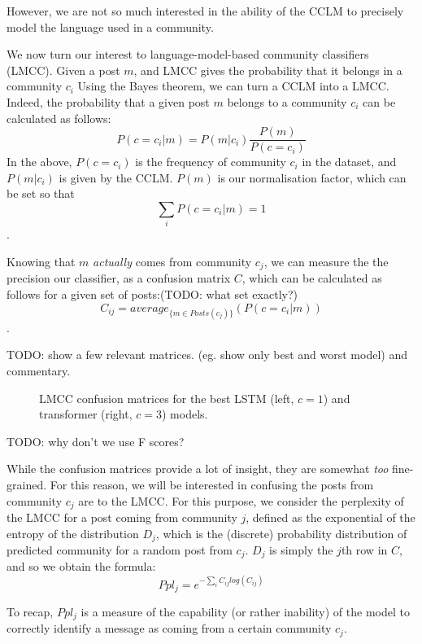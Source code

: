 \documentclass[11pt,a4paper]{article}
\begin{document}
However, we are not so much interested in the ability of the CCLM to
precisely model the language used in a community.

We now turn our interest to language-model-based community classifiers
(LMCC). Given a post $m$, and LMCC gives the probability that it
belongs in a community $c_i$ Using the Bayes theorem, we can turn a
CCLM into a LMCC. Indeed, the probability that a given post $m$
belongs to a community $c_i$ can be calculated as follows:
\[P(c=c_i | m) = P(m | c_i)\frac {P(m)} {P(c=c_i)}\]
In the above,
$P(c=c_i)$ is the frequency of community $c_i$ in the dataset, and
$P(m | c_i)$ is given by the CCLM. $P(m)$ is our normalisation factor, which can be set so that
\[\sum_i P(c=c_i | m) = 1\].

Knowing that $m$ \emph{actually} comes from community $c_j$, we can
measure the the precision our classifier, as a confusion matrix $C$,
which can be calculated as follows for a given set of posts:(TODO: what set exactly?)
\[C_{ij} = average_{\{m ∈ Posts(c_j)\}}(P(c=c_i | m))\].

TODO: show a few relevant matrices. (eg. show only best and worst model) and commentary.


\begin{figure*}
\caption{LMCC confusion matrices for the best LSTM (left, $c=1$) and transformer (right, $c=3$) models.}
\label{fig:comm-pca}
\end{figure*}


TODO: why don't we use F scores?

While the confusion matrices provide a lot of insight, they are
somewhat \emph{too} fine-grained. For this reason, we will be
interested in confusing the posts from community $c_j$ are to the
LMCC. For this purpose, we consider the perplexity of the LMCC for a
post coming from community $j$, defined as the exponential of the
entropy of the distribution \(D_j\), which is the (discrete)
probability distribution of predicted community for a random post from
$c_j$. $D_j$ is simply the $j$th row in \(C\), and so we obtain the formula:
\[Ppl_j = e^{-\sum_i C_{ij} log(C_{ij})}\]

To recap, \(Ppl_j\) is a measure of the capability (or rather
inability) of the model to correctly identify a message as coming from
a certain community $c_j$. 
\end{document}
